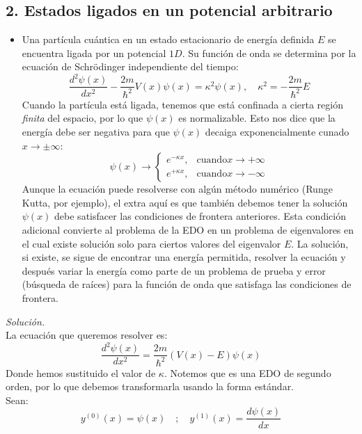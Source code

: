 \documentclass[11pt]{article}
\begin{document}
	\subsection*{\textbf{2. Estados ligados en un potencial arbitrario}}
	\begin{itemize}
	\item Una partícula cuántica en un estado estacionario de energía definida $E$ se encuentra ligada por un potencial $1D$. Su función de onda se determina por la ecuación de Schrödinger independiente del tiempo:
	$$\frac{d^2 \psi (x)}{dx^2} - \frac{2m}{\hbar^2} V(x) \psi (x) = \kappa^2 \psi(x),\quad \kappa^2 = -\frac{2m}{\hbar^2}E$$
	Cuando la partícula está ligada, tenemos que está confinada a cierta región \textit{finita} del espacio, por lo que $\psi(x)$ es normalizable. Esto nos dice que la energía debe ser negativa para que $\psi(x)$ decaiga exponencialmente cunado $x\to \pm \infty$:
	$$\psi (x )\to \left\{\begin{array}{cc}
		e^{-\kappa x},& \text{cuando} x\to +\infty	\\
		e^{+\kappa x},& \text{cuando} x\to -\infty
	\end{array}\right.$$
	Aunque la ecuación puede resolverse con algún método numérico (Runge Kutta, por ejemplo), el extra aquí es que también debemos tener la solución $\psi(x)$ debe satisfacer las condiciones de frontera anteriores. Esta condición adicional convierte al problema de la EDO en un problema de eigenvalores en el cual existe solución solo para ciertos valores del eigenvalor $E$. La solución, si existe, se sigue de encontrar una energía permitida, resolver la ecuación y después variar la energía como parte de un problema de prueba y error (búsqueda de raíces) para la función de onda que satisfaga las condiciones de frontera. 
	\end{itemize}
\newpage
	\textit{Solución.}\\
	La ecuación que queremos resolver es:
	\begin{equation}
		\frac{d^2 \psi (x)}{dx^2} = \frac{2m}{\hbar^2}\left(V(x) - E\right) \psi (x) 	\label{original}
	\end{equation}
	Donde hemos sustituido el valor de $\kappa$. Notemos que es una EDO de segundo orden, por lo que debemos transformarla usando la forma estándar.\\
	Sean:
	$$y^{(0)} (x) = \psi (x)\quad;\quad y^{(1)}(x) = \frac{d \psi(x)}{dx}$$
\end{document}

